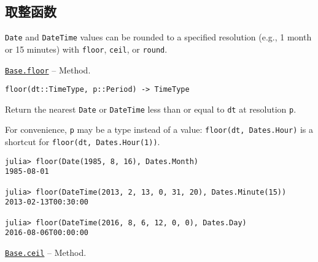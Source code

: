 \hypertarget{13058474467070921522}{}


\subsection{取整函数}



\texttt{Date} and \texttt{DateTime} values can be rounded to a specified resolution (e.g., 1 month or 15 minutes) with \texttt{floor}, \texttt{ceil}, or \texttt{round}.


\hypertarget{6962549236860281908}{} 
\hyperlink{6962549236860281908}{\texttt{Base.floor}}  -- {Method.}

\begin{adjustwidth}{2em}{0pt}


\begin{verbatim}
floor(dt::TimeType, p::Period) -> TimeType
\end{verbatim}

Return the nearest \texttt{Date} or \texttt{DateTime} less than or equal to \texttt{dt} at resolution \texttt{p}.

For convenience, \texttt{p} may be a type instead of a value: \texttt{floor(dt, Dates.Hour)} is a shortcut for \texttt{floor(dt, Dates.Hour(1))}.


\begin{verbatim}
julia> floor(Date(1985, 8, 16), Dates.Month)
1985-08-01

julia> floor(DateTime(2013, 2, 13, 0, 31, 20), Dates.Minute(15))
2013-02-13T00:30:00

julia> floor(DateTime(2016, 8, 6, 12, 0, 0), Dates.Day)
2016-08-06T00:00:00
\end{verbatim}



\end{adjustwidth}
\hypertarget{13217485408632363978}{} 
\hyperlink{13217485408632363978}{\texttt{Base.ceil}}  -- {Method.}

